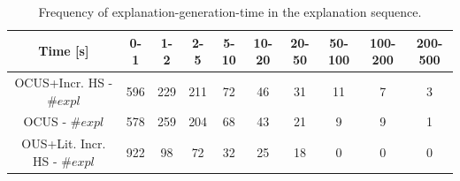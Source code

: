\begin{table}[!ht]
	\centering
\begin{tabular}{c|c|c|c|c|c|c|c|c|c}
	Time [s] &\textbf{0-1} & \textbf{1-2} & \textbf{2-5} & \textbf{5-10} & \textbf{10-20} & \textbf{20-50} & \textbf{50-100} & \textbf{100-200} & \textbf{200-500}\\
	\midrule
	OCUS+Incr. HS - $\# expl$ &596 & 229 & 211 & 72 & 46 & 31 & 11 & 7 & 3\\ %
	OCUS - $\# expl$ &578 & 259 & 204 & 68 & 43 & 21 & 9 & 9 & 1\\ %
	OUS+Lit. Incr. HS - $\# expl$ &922 & 98 & 72 & 32 & 25 & 18 & 0 & 0 & 0\\ %
\end{tabular}

	\caption{Frequency of explanation-generation-time in the explanation sequence.}
	\label{tab:explanation-time}
\end{table}


